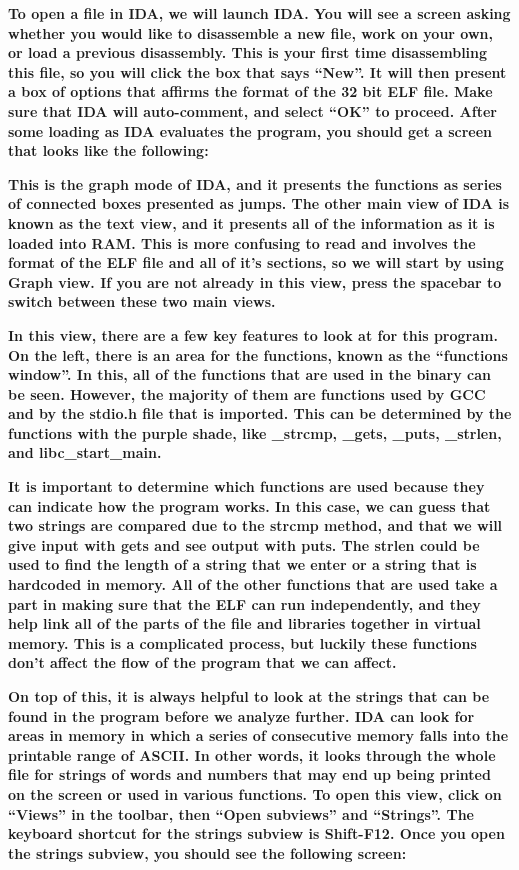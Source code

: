 \documentclass[letterpaper]{article}
\newcommand{\sitfig}[3]{
\begin{figure}[H]
\centering
\makebox[\textwidth][c]{
#2
}
\label{#1}
\end{figure}
}
\newcommand{\sitgfx}[4][scale=1.0]{
\sitfig{#3}{\texttt{[image: \#2]}}{#4}
}
\begin{document}
\textbf{To open a file in IDA, we will launch IDA. You will see a screen asking whether you would like to disassemble a
new file, work on your own, or load a previous disassembly. This is your first time disassembling this file, so you
will click the box that says ``New''. It will then present a box of options that affirms the format of the 32 bit ELF
file. Make sure that IDA will auto-comment, and select ``OK'' to proceed. After some loading as IDA evaluates the
program, you should get a screen that looks like the following:}

  
\sitgfx[width=6.5in,height=4.0626in]{reversing-img045.png}{fig:unk}{TODO CAPTION}
 \textbf{This is the graph mode of IDA, and it presents the functions as series of connected boxes presented as jumps.
The other main view of IDA is known as the text view, and it presents all of the information as it is loaded into RAM.
This is more confusing to read and involves the format of the ELF file and all of it's sections, so we will start by
using Graph view. If you are not already in this view, press the spacebar to switch between these two main views.}

\textbf{In this view, there are a few key features to look at for this program. On the left, there is an area for the
functions, known as the ``functions window''. In this, all of the functions that are used in the binary can be seen.
However, the majority of them are functions used by GCC and by the stdio.h file that is imported. This can be
determined by the functions with the purple shade, like \_strcmp, \_gets, \_puts, \_strlen, and libc\_start\_main.}

\textbf{It is important to determine which functions are used because they can indicate how the program works. In this
case, we can guess that two strings are compared due to the strcmp method, and that we will give input with gets and
see output with puts. The strlen could be used to find the length of a string that we enter or a string that is
hardcoded in memory. All of the other functions that are used take a part in making sure that the ELF can run
independently, and they help link all of the parts of the file and libraries together in virtual memory. This is a
complicated process, but luckily these functions don't affect the flow of the program that we can affect.}

\textbf{On top of this, it is always helpful to look at the strings that can be found in the program before we analyze
further. IDA can look for areas in memory in which a series of consecutive memory falls into the printable range of
ASCII. In other words, it looks through the whole file for strings of words and numbers that may end up being printed
on the screen or used in various functions. To open this view, click on ``Views'' in the toolbar, then ``Open
subviews'' and ``Strings''. The keyboard shortcut for the strings subview is Shift-F12. Once you open the strings
subview, you should see the following screen:}
\end{document}
